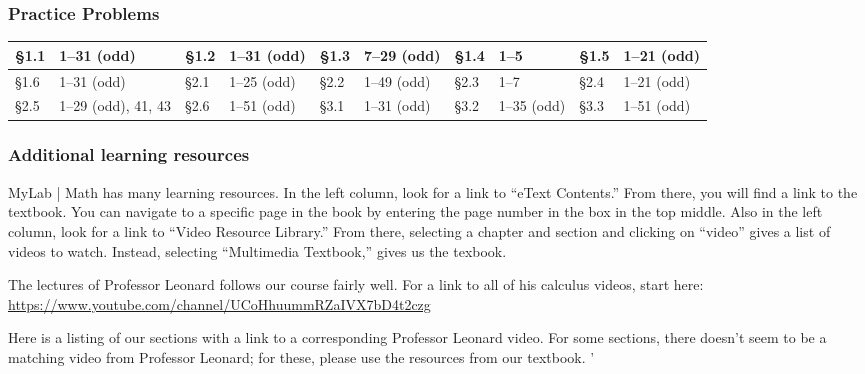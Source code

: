 \documentclass[12pt]{article}
\newcounter{ex}\setcounter{ex}{0}
\begin{document}
\subsubsection*{Practice Problems}
\begin{tabular}{|l | l || l | l || l | l || l | l || l | l |} \hline
  \S1.1 & 1--31 (odd) & 
  \S1.2 & 1--31 (odd) & 
  \S1.3 & 7--29 (odd) & 
  \S1.4 & 1--5 & 
  \S1.5 & 1--21 (odd)\\ \hline
  \S1.6 & 1--31 (odd) & 
  \S2.1 & 1--25 (odd) & 
  \S2.2 & 1--49 (odd) & 
  \S2.3 & 1--7 & \S2.4 & 
  1--21 (odd) \\ \hline
  \S2.5 & 1--29 (odd), 41, 43 & 
  \S2.6 & 1--51 (odd) &
  \S3.1 & 1--31 (odd) &
  \S3.2 & 1--35 (odd) &
  \S3.3 & 1--51 (odd)\\ \hline
\end{tabular}

\subsubsection*{Additional learning resources}


MyLab | Math has many learning resources. In the left column, look 
for a link to ``eText Contents.''  From there, you will find a 
link to the textbook.  You can navigate to a specific page in 
the book by
entering the page number in the box in the top middle.  Also in 
the left column, look for a link to ``Video Resource Library.''   From there, selecting a chapter and section and clicking on ``video'' gives a list of
videos to watch.  Instead, selecting ``Multimedia Textbook,'' 
gives us the texbook.

The lectures of Professor Leonard follows our course fairly well.  For a link to all of his calculus videos, start here: 
\url{https://www.youtube.com/channel/UCoHhuummRZaIVX7bD4t2czg   }

Here is a listing of our sections with a link to a corresponding 
Professor Leonard  video. For some sections, there doesn't seem to 
be a matching video from Professor Leonard; for these, please use 
the resources from our textbook.
'
\vspace{0.5in}
\end{document}
